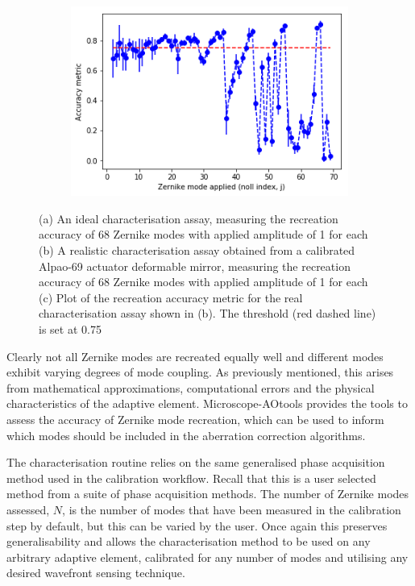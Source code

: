 \begin{figure}[h]
	\begin{subfigure}{0.9\textwidth}
		\centering
		\includegraphics[width=0.6\linewidth, scale=0.5]{./images/real_characterisation_assay_plot_metric_errorbar.png}
		\caption{}
		\label{fig:real_characterisation_assay_plot_metric_errorbar}
	\end{subfigure}
	\caption{(a) An ideal characterisation assay, measuring the recreation accuracy of 68 Zernike modes with applied amplitude of 1 for each (b) A realistic characterisation assay obtained from a calibrated Alpao-69 actuator deformable mirror, measuring the recreation accuracy of 68 Zernike modes with applied amplitude of 1 for each (c) Plot of the recreation accuracy metric for the real characterisation assay shown in (b). The threshold (red dashed line) is set at 0.75}
	\label{fig:characterisation_assay_results}
\end{figure}

Clearly not all Zernike modes are recreated equally well and  different modes exhibit varying degrees of mode coupling. As previously mentioned, this arises from mathematical approximations,
computational errors and the physical characteristics of the adaptive element. Microscope-AOtools provides the tools to assess the accuracy of Zernike mode recreation, which can be used to inform which modes should be included in the aberration correction algorithms.

The characterisation routine relies on the same generalised phase acquisition method used in the calibration workflow. Recall that this is a user selected method from a suite of phase acquisition methods. The number of Zernike modes assessed, $N$, is the number of modes that have been measured in the calibration step by default, but this can be varied by the user. Once again this preserves generalisability and allows the characterisation method to be used on any arbitrary adaptive element, calibrated for any number of modes and utilising any desired wavefront sensing technique.

